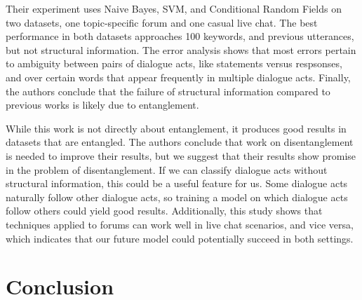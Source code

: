 \documentclass[11pt]{article}
\begin{document}
Their experiment uses Naive Bayes, SVM, and Conditional Random Fields on two
datasets, one topic-specific forum and one casual live chat. The best
performance in both datasets approaches 100%
keywords, and previous utterances, but not structural information. The error
analysis shows that most errors pertain to ambiguity between pairs of dialogue
acts, like statements versus respsonses, and over certain words that appear
frequently in multiple dialogue acts. Finally, the authors conclude that the
failure of structural information compared to previous works is likely due to
entanglement.

While this work is not directly about entanglement, it produces good results in
datasets that are entangled. The authors conclude that work on
disentanglement is needed to improve their results, but we suggest that their
results show promise in the problem of disentanglement. If we can classify
dialogue acts without structural information, this could be a useful feature
for us. Some dialogue acts naturally follow other dialogue acts, so training a
model on which dialogue acts follow others could yield good results.
Additionally, this study shows that techniques applied to forums can work well
in live chat scenarios, and vice versa, which indicates that our future model
could potentially succeed in both settings.

\section{Conclusion}

{} 
\end{document}
